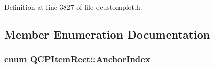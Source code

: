 Definition at line 3827 of file qcustomplot.\+h.



\subsection{Member Enumeration Documentation}
\hypertarget{class_q_c_p_item_rect_af0ebba58e6bca4851c4db726691ec0d3}{}
\subsubsection[{Anchor\+Index}]{\setlength{\rightskip}{0pt plus 5cm}enum {\bf Q\+C\+P\+Item\+Rect\+::\+Anchor\+Index}\hspace{0.3cm}{\ttfamily [protected]}}\label{class_q_c_p_item_rect_af0ebba58e6bca4851c4db726691ec0d3}
